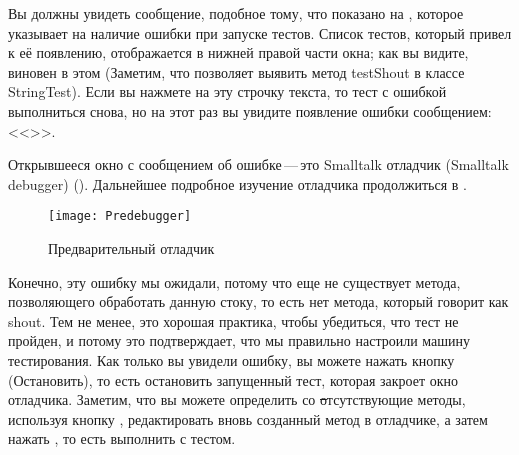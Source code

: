 \documentclass[a4paper,10pt,twoside]{book}
\begin{document}
Вы должны увидеть сообщение, подобное тому, что показано на
, которое указывает на наличие ошибки
при запуске тестов. Список тестов, который привел к её появлению,
отображается в нижней правой части окна; как вы видите,
 виновен в этом (Заметим, что
 позволяет выявить метод testShout
в классе StringTest). Если вы нажмете на эту строчку текста,
то тест с ошибкой выполниться снова, но на этот раз  вы увидите
появление ошибки сообщением:
<<>>.


Открывшееся окно с сообщением об ошибке\,---\,это Smalltalk отладчик
(Smalltalk debugger) (). Дальнейшее подробное
изучение отладчика продолжиться в . 

\begin{figure}[hbt]
\centerline {\texttt{[image: Predebugger]}}
\caption{Предварительный отладчик}
\end{figure}


Конечно, эту ошибку мы ожидали, потому что еще не существует метода,
позволяющего обработать данную стоку, то есть нет метода, который
говорит как shout. 
Тем не менее, это хорошая практика, чтобы убедиться, что тест не
пройден, и потому это подтверждает, что мы правильно настроили
машину тестирования. Как только вы увидели ошибку, вы можете нажать
кнопку  (Остановить), то есть  остановить запущенный
тест, которая закроет окно отладчика. Заметим, что вы можете
определить со \st отсутствующие методы, используя кнопку
, редактировать вновь созданный метод в отладчике,
а затем нажать , то есть выполнить с тестом. 
\end{document}
